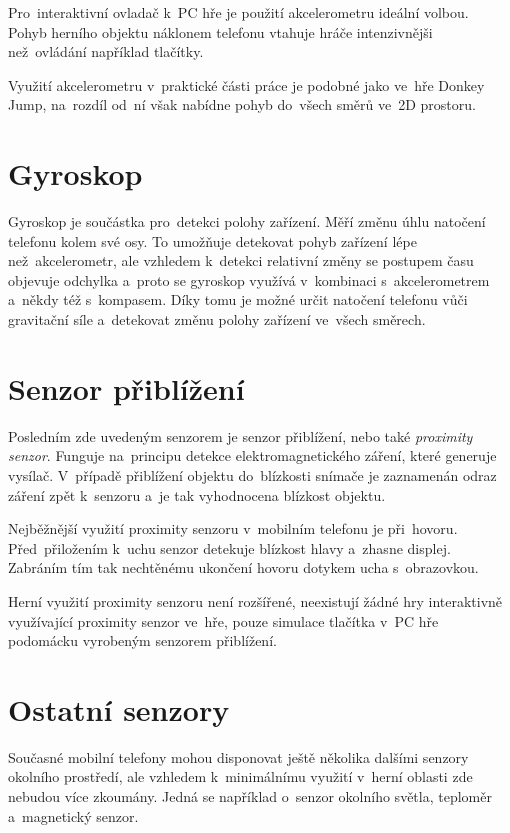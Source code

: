 \documentclass[thesis=B,czech,hidelinks]{FITthesis}[2012/06/26] %
\begin{document}
Pro~interaktivní ovladač k~PC hře je použití akcelerometru ideální volbou. Pohyb herního objektu náklonem telefonu vtahuje hráče intenzivnějši než~ovládání například tlačítky. 

Využití akcelerometru v~praktické části práce je podobné jako ve~hře Donkey Jump, na~rozdíl od~ní však nabídne pohyb do~všech směrů ve~2D prostoru.

\section{Gyroskop}

Gyroskop je součástka pro~detekci polohy zařízení. Měří změnu úhlu natočení telefonu kolem své osy. To umožňuje detekovat pohyb zařízení lépe než~akcelerometr, ale vzhledem k~detekci relativní změny se postupem času objevuje odchylka a~proto se gyroskop využívá v~kombinaci s~akcelerometrem a~někdy též s~kompasem. Díky tomu je možné určit natočení telefonu vůči gravitační síle a~detekovat změnu polohy zařízení ve~všech směrech. \cite{gyroscope}

\section{Senzor přiblížení}

Posledním zde uvedeným senzorem je senzor přiblížení, nebo také \textit{proximity senzor}. Funguje na~principu detekce elektromagnetického záření, které generuje vysílač. V~případě přiblížení objektu do~blízkosti snímače je zaznamenán odraz záření zpět k~senzoru a~je tak vyhodnocena blízkost objektu. \cite{proximity}

Nejběžnější využití proximity senzoru v~mobilním telefonu je při~hovoru. Před~přiložením k~uchu senzor detekuje blízkost hlavy a~zhasne displej. Zabráním tím tak nechtěnému ukončení hovoru dotykem ucha s~obrazovkou.

Herní využití proximity senzoru není rozšířené, neexistují žádné hry interaktivně využívající proximity senzor ve~hře, pouze simulace tlačítka v~PC hře podomácku vyrobeným senzorem přiblížení. \cite{proximitygame}

\section{Ostatní senzory}

Současné mobilní telefony mohou disponovat ještě několika dalšími senzory okolního prostředí, ale vzhledem k~minimálnímu využití v~herní oblasti zde nebudou více zkoumány. Jedná se například o~senzor okolního světla, teploměr a~magnetický senzor. 
\end{document}
